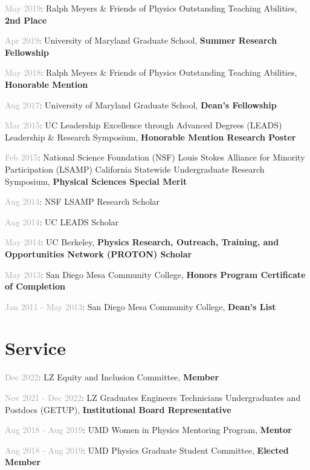 \documentclass[
  10pt,
  letterpaper,
  DIV=11,
  numbers=noendperiod]{scrartcl}
\begin{document}
\textcolor{darkgray}{May 2019}: Ralph Meyers \& Friends of Physics
Outstanding Teaching Abilities, \textbf{2nd Place}

\textcolor{darkgray}{Apr 2019}: University of Maryland Graduate School,
\textbf{Summer Research Fellowship}

\textcolor{darkgray}{May 2018}: Ralph Meyers \& Friends of Physics
Outstanding Teaching Abilities, \textbf{Honorable Mention}

\textcolor{darkgray}{Aug 2017}: University of Maryland Graduate School,
\textbf{Dean's Fellowship}

\textcolor{darkgray}{Mar 2015}: UC Leadership Excellence through
Advanced Degrees (LEADS) Leadership \& Research Symposium,
\textbf{Honorable Mention Research Poster}

\textcolor{darkgray}{Feb 2015}: National Science Foundation (NSF) Louis
Stokes Alliance for Minority Participation (LSAMP) California Statewide
Undergraduate Research Symposium, \textbf{Physical Sciences Special
Merit}

\textcolor{darkgray}{Aug 2014}: NSF LSAMP Research Scholar

\textcolor{darkgray}{Aug 2014}: UC LEADS Scholar

\textcolor{darkgray}{May 2014}: UC Berkeley, \textbf{Physics Research,
Outreach, Training, and Opportunities Network (PROTON) Scholar}

\textcolor{darkgray}{May 2013}: San Diego Mesa Community College,
\textbf{Honors Program Certificate of Completion}

\textcolor{darkgray}{Jan 2011 - May 2013}: San Diego Mesa Community
College, \textbf{Dean's List}

\hypertarget{fa-people-carry-service}{%
\section{\texorpdfstring{
Service}{ Service}}\label{fa-people-carry-service}}

\textcolor{darkgray}{Dec 2022}: LZ Equity and Inclusion Committee,
\textbf{Member}

\textcolor{darkgray}{Nov 2021 - Dec 2022}: LZ Graduates Engineers
Technicians Undergraduates and Postdocs (GETUP), \textbf{Institutional
Board Representative}

\textcolor{darkgray}{Aug 2018 - Aug 2019}: UMD Women in Physics
Mentoring Program, \textbf{Mentor}

\textcolor{darkgray}{Aug 2018 - Aug 2019}: UMD Physics Graduate Student
Committee, \textbf{Elected Member}
\end{document}
